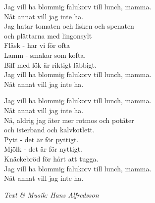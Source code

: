 \vspace{10pt}
Jag vill ha blommig falukorv till lunch, mamma.\\
Nåt annat vill jag inte ha.\\
Jag hatar tomaten och fisken och spenaten\\
och plättarna med lingonsylt\\
Fläsk - har vi för ofta\\
Lamm - smakar som kofta.\\
Biff med lök är riktigt läbbigt.\\
Jag vill ha blommig falukorv till lunch, mamma.\\
Nåt annat vill jag inte ha.\par
\vspace{10pt}
Jag vill ha blommig falukorv till lunch, mamma.\\
Nåt annat vill jag inte ha.\\
Nä, aldrig jag äter mer rotmos och potäter\\
och isterband och kalvkotlett.\\
Pytt - det är för pyttigt.\\
Mjölk - det är för nyttigt.\\
Knäckebröd för hårt att tugga.\\
Jag vill ha blommig falukorv till lunch, mamma.\\
Nåt annat vill jag inte ha.
\par
\vspace{10pt}
{\footnotesize\textit{Text \& Musik: Hans Alfredsson}}
